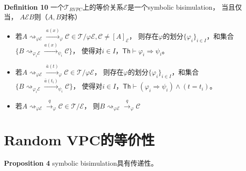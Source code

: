 \textbf{Definition 10} 一个$\mathcal{T}_{RVPC}$上的等价关系$\mathcal{E}$是一个symbolic bisimulation，
当且仅当， $A\mathcal{E}B$则（$A,B$对称）
\begin{itemize}
   \item {
      若$ A \rightsquigarrow_{\varphi \mathcal{E}}\stackrel{a(x)}{\rightarrow}_{\varphi} \mathcal{C}\in \mathcal{T}/\varphi\mathcal{E}, \mathcal{C}\neq [A]_{\mathcal{E}}$，
      则存在$\varphi$的划分$\{\varphi_i\}_{i\in I}$，和集合$\{B\rightsquigarrow_{\varphi_i \mathcal{E}}\stackrel{a(x)}{\rightarrow}_{\psi_i} \mathcal{C}\}$，
      使得对$i\in I$，$\mathsf{Th}\vdash \varphi_i \Rightarrow \psi_i$。
   }
   \item {
      若$A \rightsquigarrow_{\varphi \mathcal{E}}\stackrel{\bar{a}(t)}{\rightarrow}_{\varphi} \mathcal{C}\in \mathcal{T}/\varphi\mathcal{E}$，
      则存在$\varphi$的划分$\{\varphi_i\}_{i\in I}$，和集合$\{B\rightsquigarrow_{\varphi_i\mathcal{E}}\stackrel{\bar{a}(t_i)}{\rightarrow}_{\psi_i} \mathcal{C}\}$，
      使得对$i\in I$，$\mathsf{Th}\vdash (\varphi_i \Rightarrow \psi_i)\wedge (t=t_i)$。
   }
   \item {
      若$ A\rightsquigarrow_{\varphi\mathcal{E}} \stackrel{q}{\rightarrow}_{\varphi} \mathcal{C}\in \mathcal{T}/\mathcal{E}$，
      则$B\rightsquigarrow_{\varphi \mathcal{E}} \stackrel{q}{\rightarrow}_{\varphi} \mathcal{C}$
   }
\end{itemize}

\section{Random VPC的等价性}

\textbf{Proposition 4} symbolic bisimulation具有传递性。

